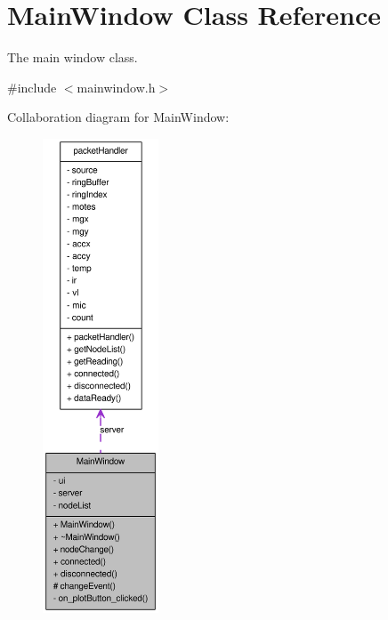 \hypertarget{classMainWindow}{
\section{MainWindow Class Reference}
\label{classMainWindow}
}


The main window class.  




{\ttfamily \#include $<$mainwindow.h$>$}



Collaboration diagram for MainWindow:\nopagebreak
\begin{figure}[H]
\begin{center}
\leavevmode
\includegraphics[height=400pt]{classMainWindow__coll__graph}
\end{center}
\end{figure}

